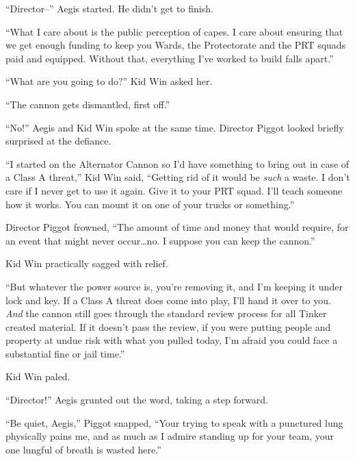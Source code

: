 ``Director--'' Aegis started.  He didn't get to finish.



``What I care about is the public perception of capes.  I care about ensuring that we get enough funding to keep you Wards, the Protectorate and the PRT squads paid and equipped.  Without that, everything I've worked to build falls apart.''



``What are you going to do?'' Kid Win asked her.



``The cannon gets dismantled, first off.''



``No!'' Aegis and Kid Win spoke at the same time.  Director Piggot looked briefly surprised at the defiance.



``I started on the Alternator Cannon so I'd have something to bring out in case of a Class A threat,'' Kid Win said, ``Getting rid of it would be \emph{such} a waste.  I don't care if I never get to use it again.  Give it to your PRT squad.  I'll teach someone how it works.  You can mount it on one of your trucks or something.''



Director Piggot frowned, ``The amount of time and money that would require, for an event that might never occur\ldots no.  I suppose you can keep the cannon.''



Kid Win practically sagged with relief.



``But whatever the power source is, you're removing it, and I'm keeping it under lock and key.  If a Class A threat does come into play, I'll hand it over to you.  \emph{And} the cannon still goes through the standard review process for all Tinker created material.  If it doesn't pass the review, if you were putting people and property at undue risk with what you pulled today, I'm afraid you could face a substantial fine or jail time.''



Kid Win paled.



``Director!'' Aegis grunted out the word, taking a step forward.



``Be quiet, Aegis,'' Piggot snapped, ``Your trying to speak with a punctured lung physically pains me, and as much as I admire standing up for your team, your one lungful of breath is wasted here.''



